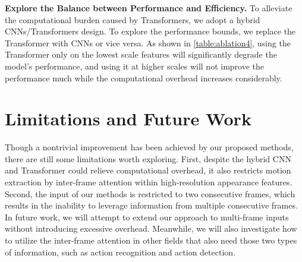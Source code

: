 \documentclass[10pt,twocolumn,letterpaper]{article}
\begin{document}
     \noindent
     \textbf{Explore the Balance between Performance and Efficiency.} To alleviate the computational burden caused by Transformers, we adopt a hybrid CNNs/Transformers design. To explore the performance bounds, we replace the Transformer with CNNs or vice versa. As shown in \cref{table:ablation4}, using the Transformer only on the lowest scale features will significantly degrade the model's performance, and using it at higher scales will not improve the performance much while the computational overhead increases considerably. 

\section{Limitations and Future Work}
    Though a nontrivial improvement has been achieved by our proposed methods, there are still some limitations worth exploring. First, despite the hybrid CNN and Transformer could relieve computational overhead, it also restricts motion extraction by inter-frame attention within high-resolution appearance features. Second, the input of our methods is restricted to two consecutive frames, which results in the inability to leverage information from multiple consecutive frames.  In future work, we will attempt to extend our approach to multi-frame inputs without introducing excessive overhead. Meanwhile, we will also investigate how to utilize the inter-frame attention in other fields that also need those two types of information, such as action recognition and action detection.
    \begin{table}[t]
    \setlength{\belowcaptionskip}{0pt}
    \renewcommand\arraystretch{1.1}
    \centering
    \caption{Ablation on diﬀerent hybrid CNNs/Transformers designs. ``C'' or ``T'' denotes we apply convolutional layers or Transformer blocks at the corresponding stage.}
    \vspace{-0.12in}
    \label{table:ablation4}
    \vspace{-0.20in}
    \end{table}
   
\end{document}

